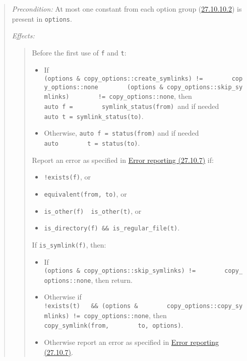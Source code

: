 \begin{quote}
\emph{Precondition:} At most one constant from each option group
(\hyperref[enum.copyux5foptions]{27.10.10.2}) is present in
\texttt{options}.

\emph{Effects:}

\begin{quote}
Before the first use of \texttt{f} and \texttt{t}:

\begin{itemize}
\tightlist
\item
  If
  \texttt{(options\ \&\ copy\_options::create\_symlinks)\ !=\ \ \ \ \ \ \ \ copy\_options::none\ \ \ \ \ \ \ \textbar{}\textbar{}\ (options\ \&\ copy\_options::skip\_symlinks)\ \ \ \ \ \ \ \ !=\ copy\_options::none},
  then \texttt{auto\ f\ =\ \ \ \ \ \ \ \ symlink\_status(from)\ }and if
  needed \texttt{auto\ t\ =\ symlink\_status(to)}.
\item
  Otherwise, \texttt{auto\ f\ =\ status(from)} and if needed
  \texttt{auto\ \ \ \ \ \ \ \ t\ =\ status(to)}.
\end{itemize}

Report an error as specified in \hyperref[Error-reporting]{Error
reporting (27.10.7)} if:

\begin{itemize}
\tightlist
\item
  \texttt{!exists(f)}, or
\item
  \texttt{equivalent(from,\ to)}, or
\item
  \texttt{is\_other(f)\ \textbar{}\textbar{}\ is\_other(t)}, or
\item
  \texttt{is\_directory(f)\ \&\&\ is\_regular\_file(t)}.
\end{itemize}

If \texttt{is\_symlink(f)}, then:

\begin{itemize}
\tightlist
\item
  If
  \texttt{(options\ \&\ copy\_options::skip\_symlinks)\ !=\ \ \ \ \ \ \ \ copy\_options::none},
  then return.
\item
  Otherwise if
  \texttt{!exists(t)\ ~\ \&\&\ (options\ \&\ \ \ \ \ \ \ \ copy\_options::copy\_symlinks)\ !=\ copy\_options::none},
  then \texttt{copy\_symlink(from,\ \ \ \ \ \ \ \ to,\ options)}.
\item
  Otherwise report an error as specified in
  \hyperref[Error-reporting]{Error reporting (27.10.7)}.
\end{itemize}


\end{quote}
\end{quote}
